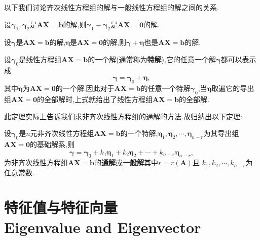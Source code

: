 \documentclass[9pt,a4paper]{book}
\begin{document}
以下我们讨论齐次线性方程组的解与一般线性方程组的解之间的关系.
\begin{feature}
	设$ \bm{\gamma}_1,\bm{\gamma}_2 $是$ \bm{AX}=\bm{b} $的解,则$ \bm{\gamma}_1-\bm{\gamma}_2 $是$ \bm{AX}=\bm{0} $的解.
\end{feature}
\begin{feature}
	设$ \bm{\gamma} $是$ \bm{AX}=\bm{b} $的解,$ \bm{\eta} $是$ \bm{AX}=\bm{0} $的解,则$ \bm{\gamma}+\bm{\eta} $也是$ \bm{AX}=\bm{b} $的解.
\end{feature}
\begin{theorem}
	设$ \bm{\gamma}_0 $是线性方程组$ \bm{AX}=\bm{b} $的一个解(通常称为\textbf{特解}),它的任意一个解$ \bm{\gamma} $都可以表示成\[ \bm{\gamma}=\bm{\gamma}_0+\bm{\eta} ,\]其中$ \bm{\eta} $为$ \bm{AX}=\bm{0} $的一个解.因此对于$ \bm{AX}=\bm{b} $的任意一个特解$ \bm{\gamma}_0 $,当$ \bm{\eta} $取遍它的导出组$ \bm{AX}=\bm{0} $的全部解时,上式就给出了线性方程组$ \bm{AX}=\bm{b} $的全部解.
\end{theorem}
此定理实际上告诉我们求非齐次线性方程组的通解的方法.故归纳出以下定理:
\begin{theorem}
	设$ \bm{\gamma}_0 $是$ n $元非齐次线性方程组$ \bm{AX}=\bm{b} $的一个特解,$ \bm{\eta}_1,\bm{\eta}_2,\cdots,\bm{\eta}_{n-r} $为其导出组$ \bm{AX}=\bm{0} $的基础解系,则\[ \bm{\gamma}=\bm{\gamma}_0+k_1\bm{\eta}_1+k_2\bm{\eta}_2+\cdots+k_{n-r}\bm{\eta}_{n-r}, \]为非齐次线性方程组$ \bm{AX}=\bm{b} $的\textbf{通解}或\textbf{一般解}其中$ r=r(\bm{A})$且 $ k_1,k_2,\cdots,k_{n-r} $为任意常数.
\end{theorem}


\chapter{特征值与特征向量\\Eigenvalue and Eigenvector}
\end{document}
